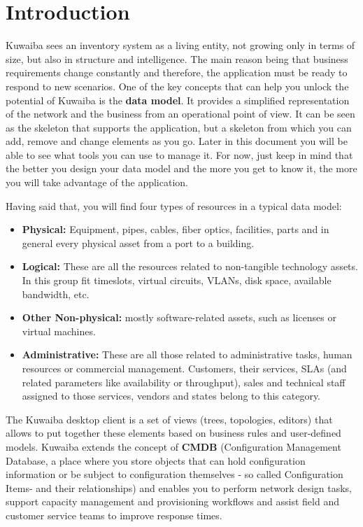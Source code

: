 \documentclass[a4paper]{article}
\begin{document}
	\section{Introduction}
	Kuwaiba sees an inventory system as a living entity, not growing only in terms of size, but also in structure and intelligence. The main reason being that business requirements change constantly and therefore, the application must be ready to respond to new scenarios. One of the key concepts that can help you unlock the potential of Kuwaiba is the \textbf{data model}. It provides a simplified representation of the network and the business from an operational point of view. It can be seen as the skeleton that supports the application, but a skeleton from which you can add, remove and change elements as you go. Later in this document you will be able to see what tools you can use to manage it. For now, just keep in mind that the better you design your data model and the more you get to know it, the more you will take advantage of the application.\newline
	
	Having said that, you will find four types of resources in a typical data model:
	\begin{itemize}
		\item \textbf{Physical:} Equipment, pipes, cables, fiber optics, facilities, parts and in general every physical asset from a port to a building. 
		\item \textbf{Logical:} These are all the resources related to non-tangible technology assets. In this group fit timeslots, virtual circuits, VLANs, disk space, available bandwidth, etc.
		\item \textbf{Other Non-physical:} mostly software-related assets, such as licenses or virtual machines.
		\item \textbf{Administrative:} These are all those related to administrative tasks, human resources or commercial management. Customers, their services, SLAs (and related parameters like availability or throughput), sales and technical staff assigned to those services, vendors and states belong to this category.
	\end{itemize}
	The Kuwaiba desktop client is a set of views (trees, topologies, editors) that allows to put together these elements based on business rules and  user-defined models. Kuwaiba extends the concept of \textbf{CMDB} (Configuration Management Database, a place where you store objects that can hold configuration information or be subject to configuration themselves - so called Configuration Items- and their relationships)  and enables you to perform network design tasks, support capacity management and provisioning workflows and assist field and customer service teams to improve response times.\newline
	
\end{document}
